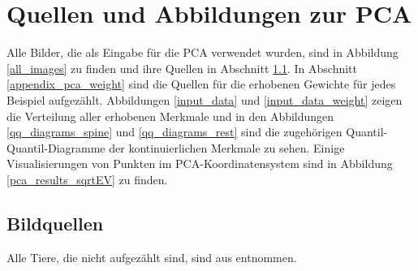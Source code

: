 \chapter{Quellen und Abbildungen zur PCA}
\label{appendix_pca}

Alle Bilder, die als Eingabe für die PCA verwendet wurden, sind in Abbildung \ref{all_images} zu finden und ihre Quellen in Abschnitt \ref{picture_sources}. In Abschnitt \ref{appendix_pca_weight} sind die Quellen für die erhobenen Gewichte für jedes Beispiel aufgezählt. 
Abbildungen \ref{input_data} und \ref{input_data_weight} zeigen die Verteilung aller erhobenen Merkmale und in den Abbildungen \ref{qq_diagrams_spine} und  \ref{qq_diagrams_rest} sind die zugehörigen Quantil-Quantil-Diagramme der kontinuierlichen Merkmale zu sehen.
Einige Visualisierungen von Punkten im PCA-Koordinatensystem sind in Abbildung \ref{pca_results_sqrtEV} zu finden.

\section{Bildquellen}
\label{picture_sources}
 
 Alle Tiere, die nicht aufgezählt sind, sind aus \cite{Spezielle_Zoologie} entnommen.
 
